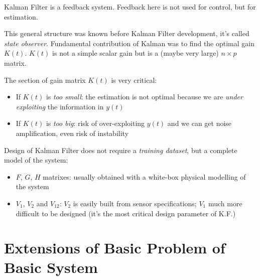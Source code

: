 Kalman Filter is a feedback system.
Feedback here is not used for control, but for estimation.

This general structure was known before Kalman Filter development, it's called \emph{state observer}.
Fundamental contribution of Kalman was to find the optimal gain $K(t)$.
$K(t)$ is not a simple scalar gain but is a (maybe very large) $n\times p$ matrix.

The section of gain matrix $K(t)$ is very critical:
\begin{itemize}
    \item If $K(t)$ is \emph{too small}: the estimation is not optimal because we are \emph{under exploiting} the information in $y(t)$
    \item If $K(t)$ is \emph{too big}: risk of over-exploiting $y(t)$ and we can get noise amplification, even risk of instability
\end{itemize}

Design of Kalman Filter does not require a \emph{training dataset}, but a complete model of the system:
\begin{itemize}
    \item $F$, $G$, $H$ matrixes: usually obtained with a white-box physical modelling of the system
    \item $V_1$, $V_2$ and $V_{12}$: $V_2$ is easily built from sensor specifications; $V_1$ much more difficult to be designed (it's the most critical design parameter of K.F.)
\end{itemize}

\section{Extensions of Basic Problem of Basic System}

